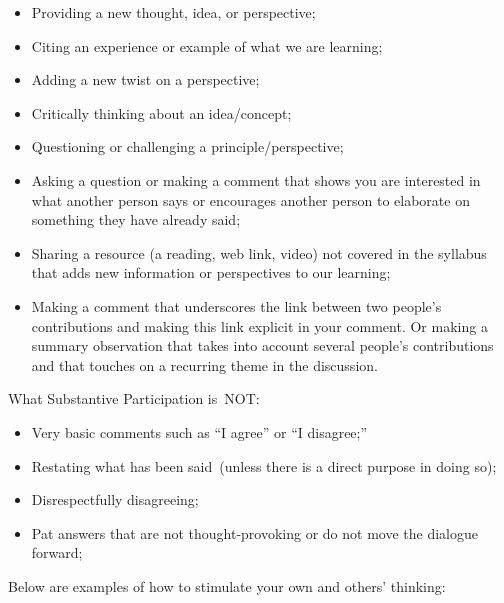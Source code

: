 \documentclass[
]{book}
\providecommand{\tightlist}{%
  \setlength{\itemsep}{0pt}\setlength{\parskip}{0pt}}
\theoremstyle{definition}
\theoremstyle{definition}
\theoremstyle{definition}
\theoremstyle{definition}
\theoremstyle{remark}
\begin{document}
\begin{itemize}
\tightlist
\item
  Providing a new thought, idea, or perspective;\\
\item
  Citing an experience or example of what we are learning;\\
\item
  Adding a new twist on a perspective;\\
\item
  Critically thinking about an idea/concept;\\
\item
  Questioning or challenging a principle/perspective;\\
\item
  Asking a question or making a comment that shows you are interested in what another person says or encourages another person to elaborate on something they have already said;\\
\item
  Sharing a resource (a reading, web link, video) not covered in the syllabus that adds new information or perspectives to our learning;\\
\item
  Making a comment that underscores the link between two people's contributions and making this link explicit in your comment. Or making a summary observation that takes into account several people's contributions and that touches on a recurring theme in the discussion.
\end{itemize}

What Substantive Participation is~NOT:

\begin{itemize}
\tightlist
\item
  Very basic comments such as ``I agree'' or ``I disagree;''\\
\item
  Restating what has been said~(unless there is a direct purpose in doing so);\\
\item
  Disrespectfully disagreeing;\\
\item
  Pat answers that are not thought-provoking or do not move the dialogue forward;
\end{itemize}

Below are examples of how to stimulate your own and others' thinking:
\end{document}

